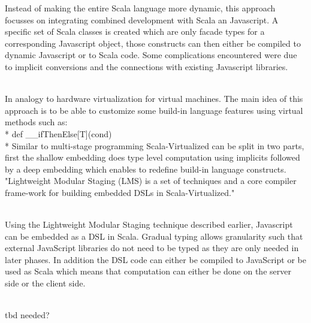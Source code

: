 Instead of making the entire Scala language more dynamic, this approach focusses on integrating combined development with Scala an Javascript. A specific set of Scala classes is created which are only facade types for a corresponding Javascript object, those constructs can then either be compiled to dynamic Javascript or to Scala code. Some complications encountered were due to implicit conversions and the connections with existing Javascript libraries.
\\
\\

In analogy to hardware virtualization for virtual machines. The main idea of this approach is to be able to customize some build-in language features using virtual methods such as:\\*
{\ttfamily def \_\_ifThenElse[T](cond) }\\*
Similar to multi-stage programming Scala-Virtualized can be split in two parts, first the shallow embedding does type level computation using implicits followed by a deep embedding which enables to redefine build-in language constructs. "Lightweight Modular Staging (LMS) is a set of techniques and a core compiler frame-work for building embedded DSLs in Scala-Virtualized."
\\
\\

Using the Lightweight Modular Staging technique described earlier, Javascript can be embedded as a DSL in Scala. Gradual typing allows granularity such that external JavaScript libraries do not need to be typed as they are only needed in later phases. In addition the DSL code can either be compiled to JavaScript or be used as Scala which means  that computation can either be done on the server side or the client side. 
\\
\\

tbd needed?
\\
\\

